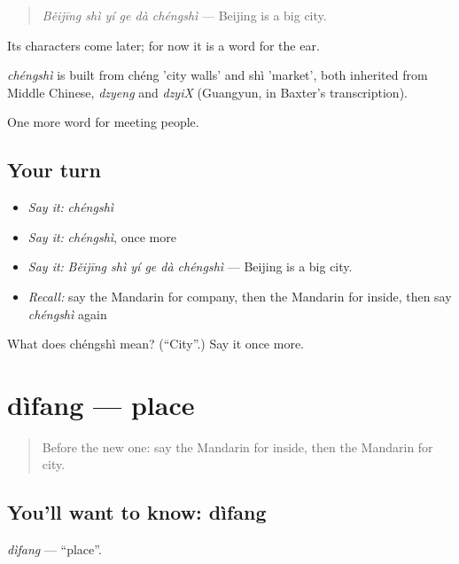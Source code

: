 \begin{quote}
\emph{Běijīng shì yí ge dà chéngshì} — Beijing is a big city.
\end{quote}

Its characters come later; for now it is a word for the ear.

\begin{cousinweb}
\emph{chéngshì} is built from chéng 'city walls' and shì 'market', both inherited from Middle Chinese, \emph{dzyeng} and \emph{dzyiX} (Guangyun, in Baxter's transcription).
\end{cousinweb}

\begin{grammarlens}[title={What you've built}]
One more word for meeting people.
\end{grammarlens}

\subsection*{Your turn}
\begin{itemize}
\raggedright
  \item \emph{Say it:} \emph{chéngshì}
  \item \emph{Say it:} \emph{chéngshì}, once more
  \item \emph{Say it:} \emph{Běijīng shì yí ge dà chéngshì} — Beijing is a big city.
  \item \emph{Recall:} say the Mandarin for company, then the Mandarin for inside, then say \emph{chéngshì} again
\end{itemize}

\begin{tcolorbox}[breakable,colback=teal!4,colframe=teal!35!black,title={Before you move on}]
What does chéngshì mean? (\textquotedblleft{}City\textquotedblright{}.) Say it once more.
\end{tcolorbox}
\section[dìfang]{dìfang — place}

\label{lesson:ZH-C81-difang}



\begin{quote}
Before the new one: say the Mandarin for inside, then the Mandarin for city.
\end{quote}

\subsection*{You'll want to know: dìfang}
\emph{dìfang} — \textquotedblleft{}place\textquotedblright{}.

